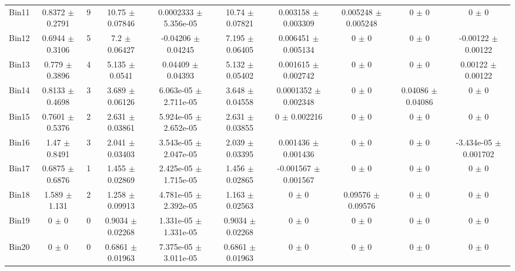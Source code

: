 \begin{tabular}{@{\extracolsep{4pt}}lccccccccc@{}}
     Bin11 & 0.8372 $\pm$ 0.2791 & 9 & 10.75 $\pm$ 0.07846 & 0.0002333 $\pm$ 5.356e-05 & 10.74 $\pm$ 0.07821 & 0.003158 $\pm$ 0.003309 & 0.005248 $\pm$ 0.005248 & 0 $\pm$ 0 & 0 $\pm$ 0 \\ 
     Bin12 & 0.6944 $\pm$ 0.3106 & 5 & 7.2 $\pm$ 0.06427 & -0.04206 $\pm$ 0.04245 & 7.195 $\pm$ 0.06405 & 0.006451 $\pm$ 0.005134 & 0 $\pm$ 0 & 0 $\pm$ 0 & -0.00122 $\pm$ 0.00122 \\ 
     Bin13 & 0.779 $\pm$ 0.3896 & 4 & 5.135 $\pm$ 0.0541 & 0.04409 $\pm$ 0.04393 & 5.132 $\pm$ 0.05402 & 0.001615 $\pm$ 0.002742 & 0 $\pm$ 0 & 0 $\pm$ 0 & 0.00122 $\pm$ 0.00122 \\ 
     Bin14 & 0.8133 $\pm$ 0.4698 & 3 & 3.689 $\pm$ 0.06126 & 6.063e-05 $\pm$ 2.711e-05 & 3.648 $\pm$ 0.04558 & 0.0001352 $\pm$ 0.002348 & 0 $\pm$ 0 & 0.04086 $\pm$ 0.04086 & 0 $\pm$ 0 \\ 
     Bin15 & 0.7601 $\pm$ 0.5376 & 2 & 2.631 $\pm$ 0.03861 & 5.924e-05 $\pm$ 2.652e-05 & 2.631 $\pm$ 0.03855 & 0 $\pm$ 0.002216 & 0 $\pm$ 0 & 0 $\pm$ 0 & 0 $\pm$ 0 \\ 
     Bin16 & 1.47 $\pm$ 0.8491 & 3 & 2.041 $\pm$ 0.03403 & 3.543e-05 $\pm$ 2.047e-05 & 2.039 $\pm$ 0.03395 & 0.001436 $\pm$ 0.001436 & 0 $\pm$ 0 & 0 $\pm$ 0 & -3.434e-05 $\pm$ 0.001702 \\ 
     Bin17 & 0.6875 $\pm$ 0.6876 & 1 & 1.455 $\pm$ 0.02869 & 2.425e-05 $\pm$ 1.715e-05 & 1.456 $\pm$ 0.02865 & -0.001567 $\pm$ 0.001567 & 0 $\pm$ 0 & 0 $\pm$ 0 & 0 $\pm$ 0 \\ 
     Bin18 & 1.589 $\pm$ 1.131 & 2 & 1.258 $\pm$ 0.09913 & 4.781e-05 $\pm$ 2.392e-05 & 1.163 $\pm$ 0.02563 & 0 $\pm$ 0 & 0.09576 $\pm$ 0.09576 & 0 $\pm$ 0 & 0 $\pm$ 0 \\ 
     Bin19 & 0 $\pm$ 0 & 0 & 0.9034 $\pm$ 0.02268 & 1.331e-05 $\pm$ 1.331e-05 & 0.9034 $\pm$ 0.02268 & 0 $\pm$ 0 & 0 $\pm$ 0 & 0 $\pm$ 0 & 0 $\pm$ 0 \\ 
     Bin20 & 0 $\pm$ 0 & 0 & 0.6861 $\pm$ 0.01963 & 7.375e-05 $\pm$ 3.011e-05 & 0.6861 $\pm$ 0.01963 & 0 $\pm$ 0 & 0 $\pm$ 0 & 0 $\pm$ 0 & 0 $\pm$ 0 \\ 
\hline\hline
  \end{tabular}
